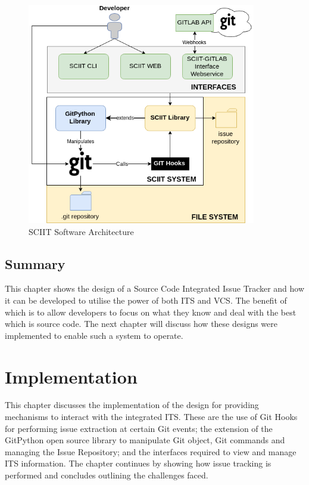 \documentclass{mproj}
\begin{document}
\begin{figure}[t]
\caption{SCIIT Software Architecture}
\label{fig:sciit-software-arch}
\centering
\includegraphics[width=10cm]{sciit-software-arch}
\end{figure}





\section{Summary}

This chapter shows the design of a Source Code Integrated Issue Tracker and how it can be developed to utilise the power of both ITS and VCS. The benefit of which is to allow developers to focus on what they know and deal with the best which is source code. The next chapter will discuss how these designs were implemented to enable such a system to operate.









\chapter{Implementation}\label{implementation}

This chapter discusses the implementation of the design for providing mechanisms to interact with the integrated ITS. These are the use of Git Hooks for performing issue extraction at certain Git events; the extension of the GitPython open source library to manipulate Git object, Git commands and managing the Issue Repository; and the interfaces required to view and manage ITS information. The chapter continues by showing how issue tracking is performed and concludes outlining the challenges faced.
\end{document}
